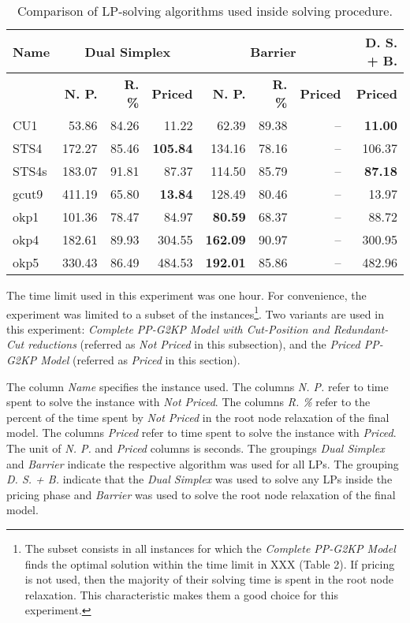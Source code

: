 \documentclass[smallextended]{svjour3}       %
\begin{document}
\begin{table}
\caption{Comparison of LP-solving algorithms used inside solving procedure.}
\begin{tabular}{lrrrrrrr}
\hline\hline
\textbf{Name} & \multicolumn{3}{c}{Dual Simplex} & \multicolumn{3}{c}{Barrier} & \textbf{D. S. + B.} \\\hline
& \textbf{N. P.} & \textbf{R. \%} & \textbf{Priced} & \textbf{N. P.} & \textbf{R. \%} & \textbf{Priced} &  \textbf{Priced} \\\hline
CU1 & 53.86 & 84.26 & 11.22 & 62.39 & 89.38 & -- & \textbf{11.00} \\
STS4 & 172.27 & 85.46 & \textbf{105.84} & 134.16 & 78.16 & -- & 106.37 \\
STS4s & 183.07 & 91.81 & 87.37 & 114.50 & 85.79 & -- & \textbf{87.18} \\
gcut9 & 411.19 & 65.80 & \textbf{13.84} & 128.49 & 80.46 & -- & 13.97 \\
okp1 & 101.36 & 78.47 & 84.97 & \textbf{80.59} & 68.37 & -- & 88.72 \\
okp4 & 182.61 & 89.93 & 304.55 & \textbf{162.09} & 90.97 & -- & 300.95 \\
okp5 & 330.43 & 86.49 & 484.53 & \textbf{192.01} & 85.86 & -- & 482.96 \\\hline\hline
\end{tabular}
\label{tab:lp_method_comparison}
\end{table}

The time limit used in this experiment was one hour.
For convenience, the experiment was limited to a subset of the instances\footnote{
	The subset consists in all instances for which the \emph{Complete PP-G2KP Model} finds the optimal solution within the time limit in XXX (Table 2).
	If pricing is not used, then the majority of their solving time is spent in the root node relaxation.
	This characteristic makes them a good choice for this experiment.
}.
Two variants are used in this experiment: \emph{Complete PP-G2KP Model with Cut-Position and Redundant-Cut reductions} (referred as \emph{Not Priced} in this subsection), and the \emph{Priced PP-G2KP Model} (referred as \emph{Priced} in this section).

The column \emph{Name} specifies the instance used.
The columns \emph{N. P.} refer to time spent to solve the instance with \emph{Not Priced}.
The columns \emph{R. \%} refer to the percent of the time spent by \emph{Not Priced} in the root node relaxation of the final model.
The columns \emph{Priced} refer to time spent to solve the instance with \emph{Priced}. The unit of \emph{N. P.} and \emph{Priced} columns is seconds.
The groupings \emph{Dual Simplex} and \emph{Barrier} indicate the respective algorithm was used for all LPs.
The grouping \emph{D. S. + B.} indicate that the \emph{Dual Simplex} was used to solve any LPs inside the pricing phase and \emph{Barrier} was used to solve the root node relaxation of the final model.
\end{document}
